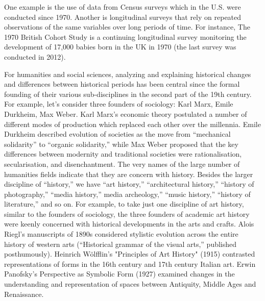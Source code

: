 \documentclass[letterpaper]{article}
\begin{document}
One example is the use of data from Census surveys which in the U.S. were conducted since 1970. Another is longitudinal surveys that rely on repeated observations of the same variables over long periods of time. For instance, The 1970 British Cohort Study is a continuing longitudinal survey monitoring the development of 17,000 babies born in the UK in 1970 (the last survey was conducted in 2012).



	For humanities and social sciences, analyzing and explaining historical changes and differences between historical periods has been central since the formal founding of their various sub-disciplines in the second part of the 19th century. For example, let’s consider three founders of sociology: Karl Marx, Emile Durkheim, Max Weber. Karl Marx’s  economic theory postulated a number of different modes of production which replaced each other over the millennia. Emile Durkheim described evolution of societies as the move from “mechanical solidarity” to “organic solidarity,” while Max Weber proposed that the key differences between modernity and traditional societies were rationalisation, secularisation, and disenchantment. 
The very names of the large number of humanities fields indicate that they are concern with history. Besides the larger discipline of “history,” we have “art history,” “architectural history,” “history of photography,” “media history,” media archeology,” “music history,” “history of literature,” and so on. For example, to take just one discipline of art history, similar to the founders of sociology, the three founders of academic art history were keenly concerned with historical developments in the arts and crafts. Alois Riegl’s manuscripts of 1890s considered stylistic evolution across the entire history of western arts (“Historical grammar of the visual arts,” published posthumously). Heinrich Wölfflin’s "Principles of Art History" (1915) contrasted representations of forms in the 16th century and 17th century Italian art. Erwin Panofsky’s Perspective as Symbolic Form (1927) examined changes in the understanding and representation of spaces between Antiquity, Middle Ages and Renaissance.
\end{document}
